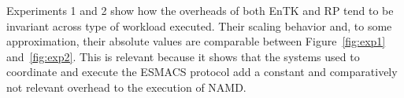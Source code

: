 Experiments 1 and 2 show how the overheads of both EnTK and RP tend to be
invariant across type of workload executed. Their scaling behavior and, to
some approximation, their absolute values are comparable between
Figure~\ref{fig:exp1} and~\ref{fig:exp2}. This is relevant because it shows
that the systems used to coordinate and execute the ESMACS protocol add a
constant and comparatively not relevant overhead to the execution of NAMD\@.
